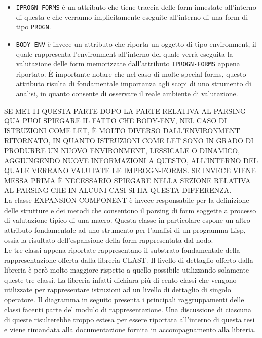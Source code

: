 \begin{itemize}

\item \texttt{IPROGN-FORMS} è un attributo che tiene traccia delle form innestate all’interno di questa e che verranno implicitamente eseguite all’interno di una form di tipo \texttt{PROGN}.

\item \texttt{BODY-ENV} è invece un attributo che riporta un oggetto di tipo environment, il quale rappresenta l’environment all’interno del quale verrà eseguita la valutazione delle form memorizzate dall’attributo \texttt{IPROGN-FORMS} appena riportato. È importante notare che nel caso di molte special forms, questo attributo risulta di fondamentale importanza agli scopi di uno strumento di analisi, in quanto consente di osservare il reale ambiente di valutazione.

\end{itemize}

SE METTI QUESTA PARTE DOPO LA PARTE RELATIVA AL PARSING QUA PUOI SPIEGARE IL FATTO CHE BODY-ENV, NEL CASO DI ISTRUZIONI COME LET, È MOLTO DIVERSO DALL’ENVIRONMENT RITORNATO, IN QUANTO ISTRUZIONI COME LET SONO IN GRADO DI PRODURRE UN NUOVO ENVIRONMENT, LESSICALE O DINAMICO, AGGIUNGENDO NUOVE INFORMAZIONI A QUESTO, ALL’INTERNO DEL QUALE VERRANO VALUTATE LE IMPROGN-FORMS. SE INVECE VIENE MESSA PRIMA È NECESSARIO SPIEGARE NELLA SEZIONE RELATIVA AL PARSING CHE IN ALCUNI CASI SI HA QUESTA DIFFERENZA.\\

La classe EXPANSION-COMPONENT è invece responsabile per la definizione delle strutture e dei metodi che consentono il parsing di form soggette a processo di valutazione tipico di una macro. Questa classe in particolare espone un altro attributo fondamentale ad uno strumento per l’analisi di un programma Lisp, ossia la risultato dell’espansione della form rappresentata dal nodo.\\

Le tre classi appena riportate rappresentano il substrato fondamentale della rappresentazione offerta dalla libreria CLAST. Il livello di dettaglio offerto dalla libreria è però molto maggiore rispetto a quello possibile utilizzando solamente queste tre classi. La libreria infatti dichiara più di cento classi che vengono utilizzate per rappresentare istruzioni ad un livello di dettaglio di singolo operatore. Il diagramma in seguito presenta i principali raggruppamenti delle classi facenti parte del modulo di rappresentazione. Una discussione di ciascuna di queste risulterebbe troppo estesa per essere riportata all’interno di questa tesi e viene rimandata alla documentazione fornita in accompagnamento alla libreria.

